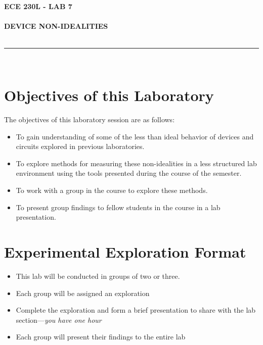 \documentclass[12pt]{../manual}
\begin{document}
\begin{center}
\textbf{\huge ECE 230L - LAB 7}\\~\\
\textbf{\large DEVICE NON-IDEALITIES}\\~\\
\rule{6.5in}{0.5mm}\\
\end{center}

\tableofcontents

\listoffigures

\newpage
%
\section{Objectives of this Laboratory}
The objectives of this laboratory session are as follows:
\begin{itemize}
\item To gain understanding of some of the less than ideal behavior of devices and circuits explored in previous laboratories. 
\item To explore methods for measuring these non-idealities in a less structured lab environment using the tools presented during the course of the semester.
\item To work with a group in the course to explore these methods.
\item To present group findings to fellow students in the course in a lab presentation.
\end{itemize}

\section{Experimental Exploration Format}
\begin{itemize}
\item This lab will be conducted in groups of two or three. 
\item Each group will be assigned an exploration
\item Complete the exploration and form a brief presentation to share with the lab section---\textit{you have one hour}
\item Each group will present their findings to the entire lab
\end{itemize}
\end{document}
